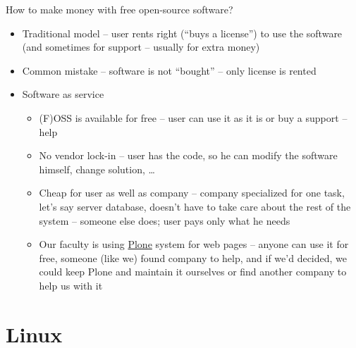 \documentclass[compress, ucs, xelatex, 11pt, xcolor=svgnames,
  hyperref={
    bookmarks=true,
    unicode=true,
    colorlinks=true,
    pdftitle={Linux, command line and MetaCentrum},
    plainpages=false,
    pdfauthor={Vojtech Zeisek},
    pdfsubject={Course about use of Linux command line, writing shell scripts and using MetaCentrum of CESNET},
    pdfcreator={XeLaTeX},
    pdfkeywords={Linux, GNU, BASH, shell, command line, MetaCentrum},
    linkcolor=Red,
    anchorcolor=Blue,
    citecolor=Purple,
    filecolor=DodgerBlue,
    menucolor=DarkOrchid,
    urlcolor=DeepSkyBlue,
    pdftex},
  url={hyphens, lowtilde} %
  ]{beamer}
\begin{document}
\begin{frame}{How to make money with free open-source software?}
\begin{itemize}
  \item Traditional model -- user rents right (``buys a license'') to use the software (and sometimes for support -- usually for extra money)
  \item Common mistake -- software is not ``bought'' -- only license is rented
  \item Software as service
  \begin{itemize}
    \item (F)OSS is available for free -- user can use it as it is or buy a support -- help
    \item No vendor lock-in -- user has the code, so he can modify the software himself, change solution, \ldots
    \item Cheap for user as well as company -- company specialized for one task, let's say server database, doesn't have to take care about the rest of the system -- someone else does; user pays only what he needs
    \item Our faculty is using \href{https://plone.org/}{Plone} system for web pages -- anyone can use it for free, someone (like we) found company to help, and if we'd decided, we  could keep Plone and maintain it ourselves or find another company to help us with it
  \end{itemize}
\end{itemize}
\end{frame}

\section{Linux}
\end{document}
